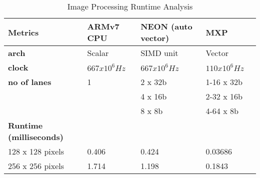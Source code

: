 \begin{table}[htbp]
	\centering
		\begin{adjustbox}{width=.9\textwidth}
		\small
	\begin{tabular}{lllll}
		\toprule
		\textbf{Metrics} & \textbf{ARMv7 CPU} & \textbf{NEON (auto vector)} & \textbf{MXP} \\
		\midrule
		\textbf{arch} & Scalar & SIMD unit & Vector \\
		\textbf{clock} & $667 x 10^{6}Hz$ & $667 x 10^{6}Hz$ & $110 x 10^{6}Hz$ \\
		\textbf{no of lanes} & 1 & 2 x 32b & 1-16 x 32b \\
		&   & 4 x 16b & 2-32 x 16b \\
		&   & 8 x 8b & 4-64 x 8b \\
		\midrule
	\textbf{Runtime (milliseconds)} &   &   &  \\
		\midrule
     128 x  128      pixels & 0.406 & 0.424 & 0.03686  \\	
	 256 x  256      pixels & 1.714 & 1.198 & 0.1843  \\
		\bottomrule
	\end{tabular}%
     \end{adjustbox}%
	\caption{Image Processing Runtime Analysis}
		\label{ga:100}%
\end{table}%